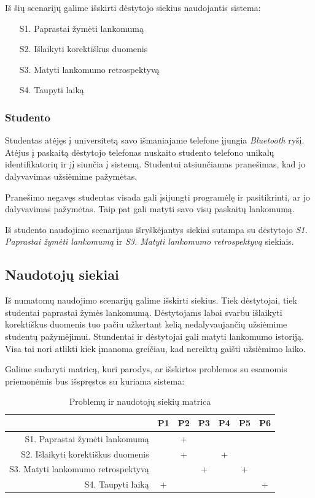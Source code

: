 \documentclass{VUMIFPSbakalaurinis}
\begin{document}
Iš šių scenarijų galime išskirti dėstytojo siekius naudojantis sistema:

\begin{itemize}
    \item[S1.] Paprastai žymėti lankomumą
    \item[S2.] Išlaikyti korektiškus duomenis
    \item[S3.] Matyti lankomumo retrospektyvą
    \item[S4.] Taupyti laiką
\end{itemize}

\subsubsection{Studento}

Studentas atėjęs į universitetą savo išmaniajame telefone įjungia \textit{Bluetooth} ryšį. Atėjus į paskaitą dėstytojo telefonas nuskaito studento telefono unikalų identifikatorių ir jį siunčia į sistemą. Studentui atsiunčiamas pranešimas, kad jo dalyvavimas užsiėmime pažymėtas.

Pranešimo negavęs studentas visada gali įsijungti programėlę ir pasitikrinti, ar jo dalyvavimas pažymėtas. Taip pat gali matyti savo visų paskaitų lankomumą.

Iš studento naudojimo scenarijaus išryškėjantys siekiai sutampa su dėstytojo \textit{S1. Paprastai žymėti lankomumą} ir \textit{S3. Matyti lankomumo retrospektyvą} siekiais.

\subsection{Naudotojų siekiai}

Iš numatomų naudojimo scenarijų galime išskirti siekius. Tiek dėstytojai, tiek studentai paprastai žymės lankomumą. Dėstytojams labai svarbu išlaikyti korektiškus duomenis tuo pačiu užkertant kelią nedalyvaujančių užsiėmime studentų pažymėjimui. Stundentai ir dėstytojai gali matyti lankomumo istoriją. Visa tai nori atlikti kiek įmanoma greičiau, kad nereiktų gaišti užsiėmimo laiko.

Galime sudaryti matricą, kuri parodys, ar išskirtos problemos su esamomis priemonėmis bus išspręstos su kuriama sistema:

\begin{table}[H]
	\centering
	\begin{tabular}{ | r | c | c | c | c | c | c | }
		\hline
		& P1 & P2 & P3 & P4 & P5 & P6 \\
		\hline
		S1. Paprastai žymėti lankomumą &  & + &  &  &  & \\
		\hline
		S2. Išlaikyti korektiškus duomenis &  & + &  & + &  & \\
		\hline
		S3. Matyti lankomumo retrospektyvą &  &  & + &  & + & \\
		\hline
		S4. Taupyti laiką & + &  &  &  &  & + \\
		\hline
	\end{tabular}
	\caption{Problemų ir naudotojų siekių matrica}
	\label{problemTable}
\end{table}
\end{document}
